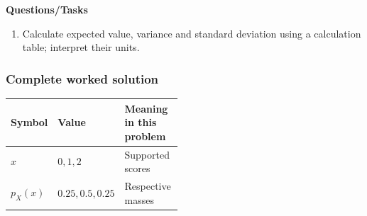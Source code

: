 \textbf{Questions/Tasks}
\begin{enumerate}
\item Calculate expected value, variance and standard deviation using a calculation table; interpret their units. 
\end{enumerate}
\subsubsection*{Complete worked solution}
\begin{center}
\begin{tabular}{llp{0.48\linewidth}}
\toprule
Symbol & Value & Meaning in this problem \\ \midrule
$x$ & $0,1,2$ & Supported scores \\
$p_X(x)$ & $0.25,0.5,0.25$ & Respective masses \\
\bottomrule
\end{tabular}
\end{center}

